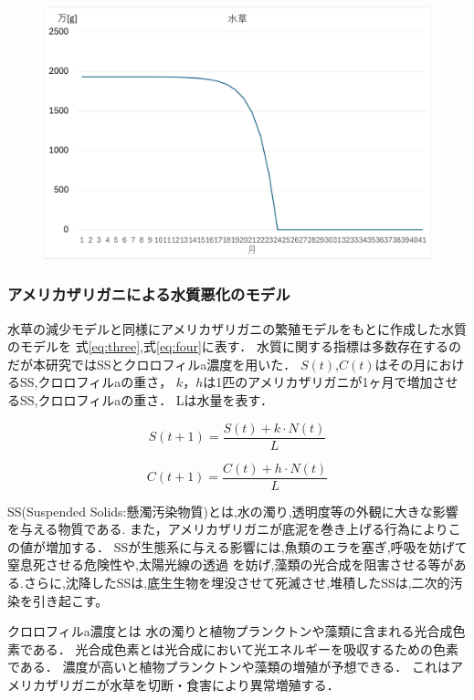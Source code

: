 \documentclass[12pt,a4j,titlepage]{ltjsarticle}
\begin{document}
{{\begin{figure}[h]
 \begin{center}
   \includegraphics[width=.95\columnwidth]{mizukusa_graph.pdf}
 \end{center}
 \end{figure}
\subsubsection{アメリカザリガニによる水質悪化のモデル}
水草の減少モデルと同様にアメリカザリガニの繁殖モデルをもとに作成した水質のモデルを
式\eqref{eq:three},式\eqref{eq:four}に表す．
水質に関する指標は多数存在するのだが本研究ではSSとクロロフィルa濃度を用いた．
$S(t)$,$C(t)$はその月におけるSS,クロロフィルaの重さ，
$k$，$h$は1匹のアメリカザリガニが1ヶ月で増加させるSS,クロロフィルaの重さ．
Lは水量を表す．

\begin{equation}
  S(t+1) = \frac{S(t) + k \cdot N(t)}{L}\label{eq:three}
\end{equation}

\begin{equation}
  C(t+1) = \frac{C(t) + h \cdot N(t)}{L}\label{eq:four}
\end{equation}

SS(Suspended Solids:懸濁汚染物質)とは,水の濁り,透明度等の外観に大きな影響を与える物質である.
また，アメリカザリガニが底泥を巻き上げる行為によりこの値が増加する．
SSが生態系に与える影響には,魚類のエラを塞ぎ,呼吸を妨げて窒息死させる危険性や,太陽光線の透過 を妨げ,藻類の光合成を阻害させる等がある.さらに,沈降したSSは,底生生物を埋没させて死滅させ,堆積したSSは,二次的汚染を引き起こす。

クロロフィルa濃度とは
水の濁りと植物プランクトンや藻類に含まれる光合成色素である．
光合成色素とは光合成において光エネルギーを吸収するための色素である．
濃度が高いと植物プランクトンや藻類の増殖が予想できる．
これはアメリカザリガニが水草を切断・食害により異常増殖する．

}}
\end{document}
